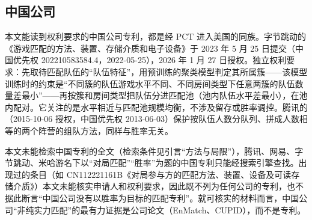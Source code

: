 \subsection{中国公司}

本文能读到权利要求的中国公司专利，都是经 PCT 进入美国的同族。字节跳动的 《游戏匹配的方法、装置、存储介质和电子设备》于 2023 年 5 月 25 日提交（中国优先权 202210583584.4，2022-05-25），2026 年 1 月 27 日授权\cite{hao2026method}\tagPat。独立权利要求：先取待匹配队伍的“队伍特征”，用预训练的聚类模型判定其所属簇——该模型训练时的约束是“不同簇的队伍游戏水平不同、不同房间类型下任意两簇的队伍数量差最小”——再按簇和房间类型把队伍分进匹配池（池内队伍水平差最小），在池内配对\tagPat。它关注的是水平相近与匹配池规模均衡，不涉及留存或胜率调控。腾讯的 （2015-10-06 授权，中国优先权 2013-06-03）保护按队伍人数分队列、拼成人数相等的两个阵营的组队方法\cite{he2015method}\tagPat，同样与胜率无关。

本文未能检索中国专利的全文（检索条件见引言“方法与局限”），腾讯、网易、字节跳动、米哈游名下以“对局匹配”“胜率”为题的中国专利只能经搜索引擎查找。出现过的条目（如 CN112221161B《对局参与方的匹配方法、装置、设备及可读存储介质》）本文未能核实申请人和权利要求\needcheck[；中国专利全文未能检索]，因此既不列为任何公司的专利，也不据此断言“中国公司没有以胜率为目标的匹配专利”。就可核实的材料而言，中国公司“非纯实力匹配”的最有力证据是公司论文（EnMatch、CUPID），而不是专利。

